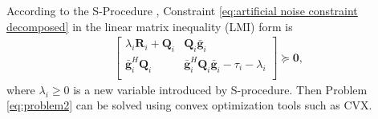\documentclass[journal]{IEEEtran}
\begin{document}
According to the S-Procedure \cite{ConvexOpt_Boyd}, Constraint \eqref{eq:artificial noise constraint decomposed}  in the linear matrix inequality (LMI) form is
\begin{eqnarray}
\left[ {\begin{array}{cc}
	\lambda_i\mathbf{R}_i+\mathbf{Q}_i  & \mathbf{Q}_i\bar{\mathbf{g}}_i \\
	\bar{\mathbf{g}}_i^H\mathbf{Q}_i& \bar{\mathbf{g}}_i^H\mathbf{Q}_i\bar{\mathbf{g}} _i- \tau_i -\lambda_i\\
	\end{array} } \right] \succeq \mathbf{0},
\end{eqnarray}
where $\lambda_i \geq 0$ is a new variable introduced by S-procedure. Then Problem \eqref{eq:problem2} can be solved using convex optimization tools such as CVX\cite{cvx}.

%
\end{document}
